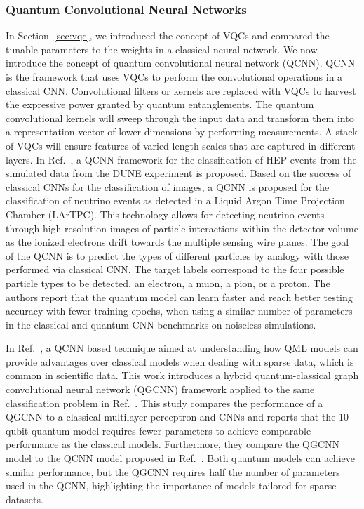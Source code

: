 \subsubsection{Quantum Convolutional Neural Networks}
\label{sec:qcnn}
In Section~\ref{sec:vqc}, we introduced the concept of VQCs and compared the tunable parameters to the weights in a classical neural network.
We now introduce the concept of quantum convolutional neural network (QCNN).
QCNN is the framework that uses VQCs to perform the convolutional operations in a classical CNN.
Convolutional filters or kernels are replaced with VQCs to harvest the expressive power granted by quantum entanglements.
The quantum convolutional kernels will sweep through the input data and transform them into a representation vector of lower dimensions by performing measurements.
A stack of VQCs will ensure features of varied length scales that are captured in different layers. 
%
In Ref.~\cite{chen2020quantum}, a QCNN framework for the classification of HEP events from the simulated data from the DUNE experiment is proposed.
Based on the success of classical CNNs for the classification of images, a QCNN is proposed for the classification of neutrino events as detected in a Liquid Argon Time Projection Chamber (LArTPC).
This technology allows for detecting neutrino events through high-resolution images of particle interactions within the detector volume as the ionized electrons drift towards the multiple sensing wire planes.
The goal of the QCNN is to predict the types of different particles by analogy with those performed via classical CNN.
The target labels correspond to the four possible particle types to be detected, an electron, a muon, a pion, or a proton.
The authors report that the quantum model can learn faster and reach better testing accuracy with fewer training epochs, when using a similar number of parameters in the classical and quantum CNN benchmarks on noiseless simulations.
%
    
In Ref.~\cite{chen2021hybrid}, a QCNN based technique aimed at understanding how QML models can provide advantages over classical models when dealing with sparse data, which is common in scientific data.
This work introduces a hybrid quantum-classical graph convolutional neural network (QGCNN) framework applied to the same classification problem in Ref.~\cite{chen2020quantum}.
This study compares the performance of a QGCNN to a classical multilayer perceptron and CNNs and reports that the 10-qubit quantum model requires fewer parameters to achieve comparable performance as the classical models.
Furthermore, they compare the QGCNN model to the QCNN model proposed in Ref.~\cite{chen2020quantum}.
Both quantum models can achieve similar performance, but the QGCNN requires half the number of parameters used in the QCNN, highlighting the importance of models tailored for sparse datasets.

